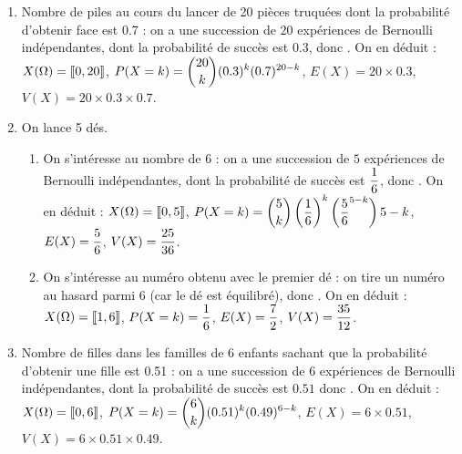 \documentclass[a4paper, 11pt,reqno]{article}
\begin{document}
\begin{correction}  \;
	\begin{enumerate}
		\item Nombre de piles au cours du lancer de 20 pi\`eces truqu\'ees dont la probabilit\'e d'obtenir face est 0.7 : on a une succession de $20$ exp\'eriences de Bernoulli ind\'ependantes, dont la probabilit\'e de succ\`es est $0.3$, donc . On en d\'eduit : $X(\Omega) = \llbracket  0, 20 \rrbracket$, $P(X=k) = \displaystyle \binom{20}{k} (0.3)^k (0.7)^{20-k}$, $E(X) = 20 \times 0.3$, $V(X) = 20 \times 0.3 \times 0.7$.
		\item On lance 5 d\'es.
		      \begin{enumerate}
			      \item On s'int\'eresse au nombre de 6 : on a une succession de $5$ exp\'eriences de Bernoulli ind\'ependantes, dont la probabilit\'e de succ\`es est $\displaystyle \frac{1}{6}$, donc . On en d\'eduit : $X(\Omega) = \llbracket  0, 5 \rrbracket$, $P(X=k) = \displaystyle \binom{5}{k} \left(\frac{1}{6}\right)^k \left(\frac{5}{6}^{5-k}\right){5-k}$, $\displaystyle E(X) = \frac{5}{6}$, $V(X) \displaystyle = \frac{25}{36}$.
			      \item On s'int\'eresse au num\'ero obtenu avec le premier d\'e : on tire un num\'ero au hasard parmi $6$ (car le d\'e est \'equilibr\'e), donc . On en d\'eduit : $X(\Omega) = \llbracket  1,6 \rrbracket$, $P(X=k) = \displaystyle \frac{1}{6}$, $\displaystyle E(X) = \frac{7}{2}$, $\displaystyle V(X) = \frac{35}{12}$.
		      \end{enumerate}
		\item Nombre de filles dans les familles de 6 enfants sachant que la probabilit\'e d'obtenir une fille est 0.51 : on a une succession de $6$ exp\'eriences de Bernoulli ind\'ependantes, dont la probabilit\'e de succ\`es est $0.51$ donc . On en d\'eduit : $X(\Omega) = \llbracket  0, 6 \rrbracket$, $P(X=k) = \displaystyle \binom{6}{k} (0.51)^k (0.49)^{6-k}$, $E(X) = 6 \times 0.51$, $V(X) = 6\times 0.51 \times 0.49$.

\end{enumerate}
\end{correction}
\end{document}
